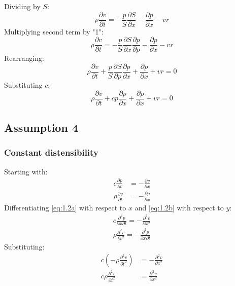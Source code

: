 \documentclass[11pt]{article}
\numberwithin{equation}{section}
\begin{document}
Dividing by $S$:
\begin{equation}
    \rho \frac{\partial v}{\partial t} = - \frac{p}{S}\frac{\partial S}{\partial x} - \frac{\partial p}{\partial x} - vr
\end{equation}
Multiplying second term by "1":
\begin{equation}
    \rho \frac{\partial v}{\partial t} = - \frac{p}{S}\frac{\partial S}{\partial x}\frac{\partial p}{\partial p} - \frac{\partial p}{\partial x} - vr
\end{equation}
Rearranging:
\begin{equation}
    \rho \frac{\partial v}{\partial t} + \frac{p}{S}\frac{\partial S}{\partial p}\frac{\partial p}{\partial x} + \frac{\partial p}{\partial x} + vr = 0
\end{equation}
Substituting $c$:
\begin{equation}
    \rho \frac{\partial v}{\partial t} + cp\frac{\partial p}{\partial x} + \frac{\partial p}{\partial x} + vr = 0
\end{equation}
\subsection{Assumption 4}
\subsubsection{Constant distensibility}
Starting with:
\begin{align}
    c\frac{\partial p}{\partial t} &= - \frac{\partial v}{\partial x} \label{eq:1.2a}\\
    \rho \frac{\partial v}{\partial t} &= -\frac{\partial p }{\partial x} \label{eq:1.2b}
\end{align}
Differentiating \ref{eq:1.2a} with respect to $x$ and \ref{eq:1.2b} with respect to $y$:
\begin{align}
    c \frac{\partial^2 p}{\partial x \partial t} = - \frac{\partial^2 v}{\partial x^2}\\
    \rho \frac{\partial^2 v }{\partial t^2} = - \frac{\partial^2 p}{\partial x \partial t}
\end{align}
Substituting:
\begin{align}
    c \left(-\rho \frac{\partial^2 v }{\partial t^2}\right) &= - \frac{\partial^2 v}{\partial x^2}\\
    c\rho \frac{\partial^2 v }{\partial t^2} &= \frac{\partial^2 v}{\partial x^2}
\end{align}
\end{document}
